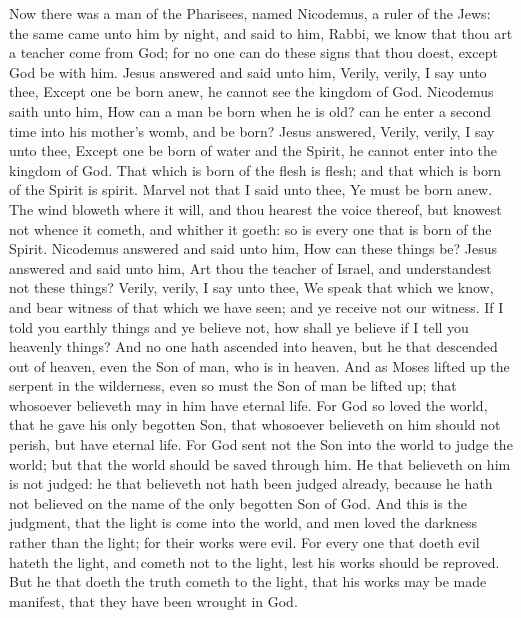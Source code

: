Now there was a man of the Pharisees, named Nicodemus, a ruler of the Jews: the same came unto him by night, and said to him, Rabbi, we know that thou art a teacher come from God; for no one can do these signs that thou doest, except God be with him. Jesus answered and said unto him, Verily, verily, I say unto thee, Except one be born anew, he cannot see the kingdom of God. Nicodemus saith unto him, How can a man be born when he is old? can he enter a second time into his mother’s womb, and be born? Jesus answered, Verily, verily, I say unto thee, Except one be born of water and the Spirit, he cannot enter into the kingdom of God. That which is born of the flesh is flesh; and that which is born of the Spirit is spirit. Marvel not that I said unto thee, Ye must be born anew. The wind bloweth where it will, and thou hearest the voice thereof, but knowest not whence it cometh, and whither it goeth: so is every one that is born of the Spirit. Nicodemus answered and said unto him, How can these things be? Jesus answered and said unto him, Art thou the teacher of Israel, and understandest not these things? Verily, verily, I say unto thee, We speak that which we know, and bear witness of that which we have seen; and ye receive not our witness. If I told you earthly things and ye believe not, how shall ye believe if I tell you heavenly things? And no one hath ascended into heaven, but he that descended out of heaven, even the Son of man, who is in heaven. And as Moses lifted up the serpent in the wilderness, even so must the Son of man be lifted up; that whosoever believeth may in him have eternal life.  For God so loved the world, that he gave his only begotten Son, that whosoever believeth on him should not perish, but have eternal life. For God sent not the Son into the world to judge the world; but that the world should be saved through him. He that believeth on him is not judged: he that believeth not hath been judged already, because he hath not believed on the name of the only begotten Son of God. And this is the judgment, that the light is come into the world, and men loved the darkness rather than the light; for their works were evil. For every one that doeth evil hateth the light, and cometh not to the light, lest his works should be reproved. But he that doeth the truth cometh to the light, that his works may be made manifest, that they have been wrought in God.  

